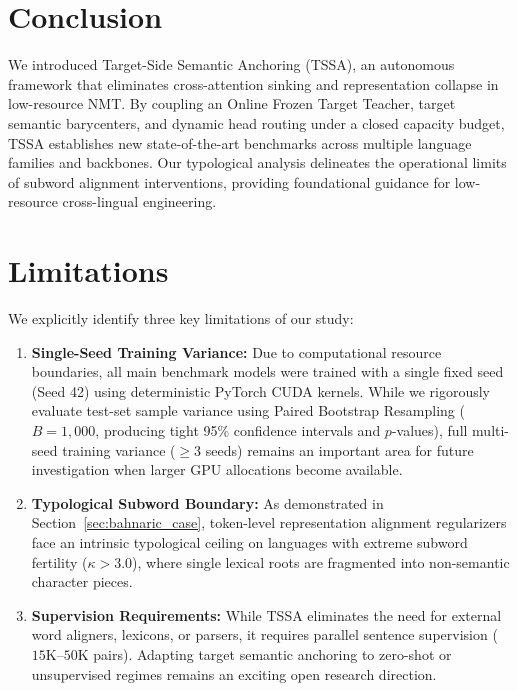 \documentclass[11pt]{article}
\begin{document}
\section{Conclusion}
\label{sec:conclusion}

We introduced Target-Side Semantic Anchoring (TSSA), an autonomous framework that eliminates cross-attention sinking and representation collapse in low-resource NMT. By coupling an Online Frozen Target Teacher, target semantic barycenters, and dynamic head routing under a closed capacity budget, TSSA establishes new state-of-the-art benchmarks across multiple language families and backbones. Our typological analysis delineates the operational limits of subword alignment interventions, providing foundational guidance for low-resource cross-lingual engineering.

\section*{Limitations}
We explicitly identify three key limitations of our study:
\begin{enumerate}[leftmargin=*]
    \item \textbf{Single-Seed Training Variance:} Due to computational resource boundaries, all main benchmark models were trained with a single fixed seed (Seed 42) using deterministic PyTorch CUDA kernels. While we rigorously evaluate test-set sample variance using Paired Bootstrap Resampling ($B=1,000$, producing tight 95\% confidence intervals and $p$-values), full multi-seed training variance ($\ge 3$ seeds) remains an important area for future investigation when larger GPU allocations become available.
    \item \textbf{Typological Subword Boundary:} As demonstrated in Section~\ref{sec:bahnaric_case}, token-level representation alignment regularizers face an intrinsic typological ceiling on languages with extreme subword fertility ($\kappa > 3.0$), where single lexical roots are fragmented into non-semantic character pieces.
    \item \textbf{Supervision Requirements:} While TSSA eliminates the need for external word aligners, lexicons, or parsers, it requires parallel sentence supervision ($15\text{K}$--$50\text{K}$ pairs). Adapting target semantic anchoring to zero-shot or unsupervised regimes remains an exciting open research direction.
\end{enumerate}
\end{document}
